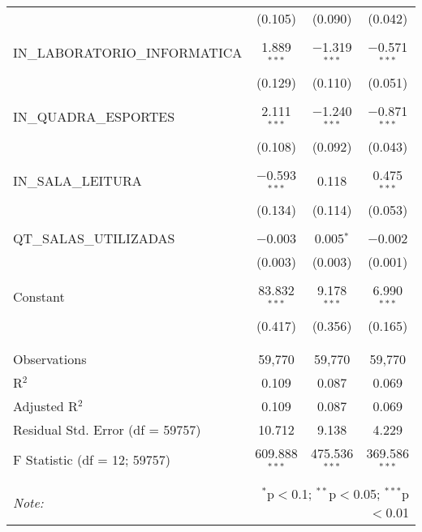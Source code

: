 \begin{table}[!htbp]
\begin{tabular}{@{\extracolsep{5pt}}lccc}
  & (0.105) & (0.090) & (0.042) \\ 
  & & & \\ 
 IN\_LABORATORIO\_INFORMATICA & 1.889$^{***}$ & $-$1.319$^{***}$ & $-$0.571$^{***}$ \\ 
  & (0.129) & (0.110) & (0.051) \\ 
  & & & \\ 
 IN\_QUADRA\_ESPORTES & 2.111$^{***}$ & $-$1.240$^{***}$ & $-$0.871$^{***}$ \\ 
  & (0.108) & (0.092) & (0.043) \\ 
  & & & \\ 
 IN\_SALA\_LEITURA & $-$0.593$^{***}$ & 0.118 & 0.475$^{***}$ \\ 
  & (0.134) & (0.114) & (0.053) \\ 
  & & & \\ 
 QT\_SALAS\_UTILIZADAS & $-$0.003 & 0.005$^{*}$ & $-$0.002 \\ 
  & (0.003) & (0.003) & (0.001) \\ 
  & & & \\ 
 Constant & 83.832$^{***}$ & 9.178$^{***}$ & 6.990$^{***}$ \\ 
  & (0.417) & (0.356) & (0.165) \\ 
  & & & \\ 
\hline \\[-1.8ex] 
Observations & 59,770 & 59,770 & 59,770 \\ 
R$^{2}$ & 0.109 & 0.087 & 0.069 \\ 
Adjusted R$^{2}$ & 0.109 & 0.087 & 0.069 \\ 
Residual Std. Error (df = 59757) & 10.712 & 9.138 & 4.229 \\ 
F Statistic (df = 12; 59757) & 609.888$^{***}$ & 475.536$^{***}$ & 369.586$^{***}$ \\ 
\hline 
\hline \\[-1.8ex] 
\textit{Note:}  & \multicolumn{3}{r}{$^{*}$p$<$0.1; $^{**}$p$<$0.05; $^{***}$p$<$0.01} \\ 
\end{tabular} 
\end{table} 
